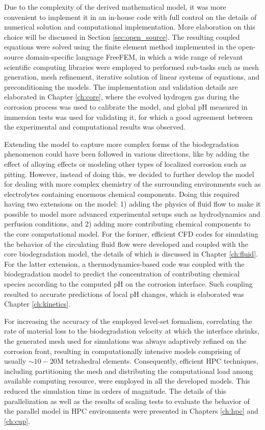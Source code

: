 Due to the complexity of the derived mathematical model, it was more convenient to implement it in an in-house code with full control on the details of numerical solution and computational implementation. More elaboration on this choice will be discussed in Section \ref{sec:open_source}. The resulting coupled equations were solved using the finite element method implemented in the open-source domain-specific language FreeFEM, in which a wide range of relevant scientific computing libraries were employed to performed sub-tasks such as mesh generation, mesh refinement, iterative solution of linear systems of equations, and preconditioning the models. The implementation and validation details are elaborated in Chapter \ref{ch:core}, where the evolved hydrogen gas during the corrosion process was used to calibrate the model, and global pH measured in immersion tests was used for validating it, for which a good agreement between the experimental and computational results was observed.

Extending the model to capture more complex forms of the biodegradation phenomenon could have been followed in various directions, like by adding the effect of alloying effects or modeling other types of localized corrosion such as pitting. However, instead of doing this, we decided to further develop the model for dealing with more complex chemistry of the surrounding environments such as electrolytes containing enormous chemical components. Doing this required having two extensions on the model: 1) adding the physics of fluid flow to make it possible to model more advanced experimental setups such as hydrodynamics and perfusion conditions, and 2) adding more contributing chemical components to the core computational model. For the former, efficient CFD codes for simulating the behavior of the circulating fluid flow were developed and coupled with the core biodegradation model, the details of which is discussed in Chapter \ref{ch:fluid}. For the latter extension, a thermodynamics-based code was coupled with the biodegradation model to predict the concentration of contributing chemical species according to the computed pH on the corrosion interface. Such coupling resulted to accurate predictions of local pH changes, which is elaborated was Chapter \ref{ch:kinetics}.

For increasing the accuracy of the employed level-set formalism, correlating the rate of material loss to the biodegradation velocity at which the interface shrinks, the generated mesh used for simulations was always adaptively refined on the corrosion front, resulting in computationally intensive models comprising of usually $\sim10-20\text{M}$ tetrahedral elements. Consequently, efficient HPC techniques, including partitioning the mesh and distributing the computational load among available computing resource, were employed in all the developed models. This reduced the simulation time in orders of magnitude. The details of this parallelization as well as the results of scaling tests to evaluate the behavior of the parallel model in HPC environments were presented in Chapters \ref{ch:hpc} and \ref{ch:cup}.

